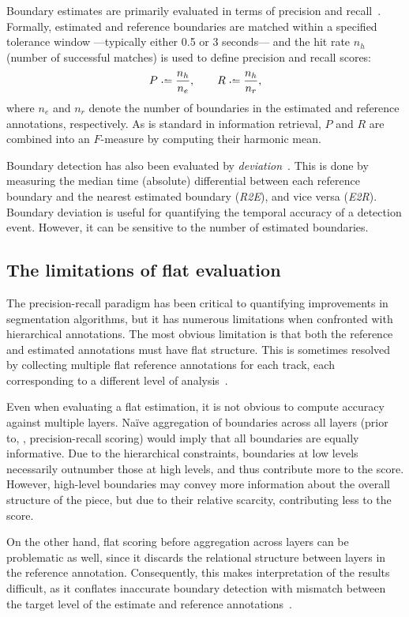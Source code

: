 \documentclass{article}
\begin{document}
Boundary estimates are primarily evaluated in terms of precision and recall~\cite{turnbull2007supervised}.
Formally, estimated and reference boundaries are matched within a specified tolerance window ---typically either 0.5 or 3 seconds--- and the hit rate $n_h$ (number of successful matches) is used to define precision and recall scores:
\begin{equation}
P \defeq \frac{n_h}{n_e}, \quad\quad R \defeq \frac{n_h}{n_r},
\end{equation}
where $n_e$ and $n_r$ denote the number of boundaries in the estimated and reference
annotations, respectively.
As is standard in information retrieval, $P$ and $R$ are combined into an $F$-measure by computing their harmonic mean.

Boundary detection has also been evaluated by \emph{deviation}~\cite{turnbull2007supervised}.
This is done by measuring the median time (absolute) differential between each reference boundary and the nearest estimated boundary (\emph{R2E}), and vice versa (\emph{E2R}).
Boundary deviation is useful for quantifying the temporal accuracy of a detection event.
However, it can be sensitive to the number of estimated boundaries.

\subsection{The limitations of flat evaluation}
The precision-recall paradigm has been critical to quantifying improvements in segmentation algorithms, but it has numerous limitations when confronted with hierarchical annotations.
The most obvious limitation is that both the reference and estimated annotations must have flat structure.
This is sometimes resolved by collecting multiple flat reference annotations for each track, 
each corresponding to a different level of analysis~\cite{Smith2011}.

Even when evaluating a flat estimation, it is not obvious to compute accuracy against multiple layers.
Na\"ive aggregation of boundaries across all layers (prior to, \eg, precision-recall scoring) would imply 
that all boundaries are equally informative.
Due to the hierarchical constraints, boundaries at low levels necessarily outnumber those at high levels, and thus contribute more to the score.
However, high-level boundaries may convey more information about the overall structure of the piece, but due to their relative scarcity, contributing less to the score.

On the other hand, flat scoring before aggregation across layers can be problematic as well, 
since it discards the relational structure between layers in the reference annotation.
Consequently, this makes interpretation of the results difficult, as it conflates
inaccurate boundary detection with mismatch between the target level of the estimate and reference
annotations~\cite{Smith2013}.
\end{document}
